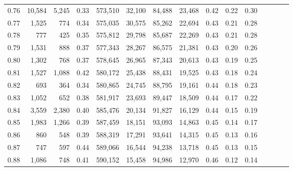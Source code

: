 \begin{tabular}{rrrcrrrrrrrrrrr}
0.76 &  10,584 &  5,245 &                                       0.33 &  573,510 &   32,100 &   84,488 &   23,468 &  0.42 &  0.22 &                         0.30 \\
0.77 &   1,525 &    774 &                                       0.34 &  575,035 &   30,575 &   85,262 &   22,694 &  0.43 &  0.21 &                         0.28 \\
0.78 &     777 &    425 &                                       0.35 &  575,812 &   29,798 &   85,687 &   22,269 &  0.43 &  0.21 &                         0.28 \\
0.79 &   1,531 &    888 &                                       0.37 &  577,343 &   28,267 &   86,575 &   21,381 &  0.43 &  0.20 &                         0.26 \\
0.80 &   1,302 &    768 &                                       0.37 &  578,645 &   26,965 &   87,343 &   20,613 &  0.43 &  0.19 &                         0.25 \\
0.81 &   1,527 &  1,088 &                                       0.42 &  580,172 &   25,438 &   88,431 &   19,525 &  0.43 &  0.18 &                         0.24 \\
0.82 &     693 &    364 &                                       0.34 &  580,865 &   24,745 &   88,795 &   19,161 &  0.44 &  0.18 &                         0.23 \\
0.83 &   1,052 &    652 &                                       0.38 &  581,917 &   23,693 &   89,447 &   18,509 &  0.44 &  0.17 &                         0.22 \\
0.84 &   3,559 &  2,380 &                                       0.40 &  585,476 &   20,134 &   91,827 &   16,129 &  0.44 &  0.15 &                         0.19 \\
0.85 &   1,983 &  1,266 &                                       0.39 &  587,459 &   18,151 &   93,093 &   14,863 &  0.45 &  0.14 &                         0.17 \\
0.86 &     860 &    548 &                                       0.39 &  588,319 &   17,291 &   93,641 &   14,315 &  0.45 &  0.13 &                         0.16 \\
0.87 &     747 &    597 &                                       0.44 &  589,066 &   16,544 &   94,238 &   13,718 &  0.45 &  0.13 &                         0.15 \\
0.88 &   1,086 &    748 &                                       0.41 &  590,152 &   15,458 &   94,986 &   12,970 &  0.46 &  0.12 &                         0.14 \\

\end{tabular}
